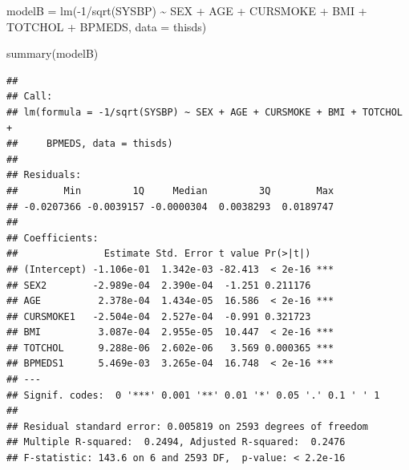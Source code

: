 \documentclass[
  10pt,
  ignorenonframetext,
]{beamer}
\newenvironment{Shaded}{\begin{snugshade}}{\end{snugshade}}
\newcommand{\AttributeTok}[1]{\textcolor[rgb]{0.77,0.63,0.00}{#1}}
\newcommand{\DecValTok}[1]{\textcolor[rgb]{0.00,0.00,0.81}{#1}}
\newcommand{\FunctionTok}[1]{\textcolor[rgb]{0.00,0.00,0.00}{#1}}
\newcommand{\NormalTok}[1]{#1}
\newcommand{\OtherTok}[1]{\textcolor[rgb]{0.56,0.35,0.01}{#1}}
\newcommand{\SpecialCharTok}[1]{\textcolor[rgb]{0.00,0.00,0.00}{#1}}
\begin{document}
\begin{frame}[fragile]
\scriptsize

\begin{Shaded}
\begin{Highlighting}[]
\NormalTok{modelB }\OtherTok{=} \FunctionTok{lm}\NormalTok{(}\SpecialCharTok{{-}}\DecValTok{1}\SpecialCharTok{/}\FunctionTok{sqrt}\NormalTok{(SYSBP) }\SpecialCharTok{\textasciitilde{}}\NormalTok{ SEX }\SpecialCharTok{+}\NormalTok{ AGE }\SpecialCharTok{+}\NormalTok{ CURSMOKE }\SpecialCharTok{+}\NormalTok{ BMI }\SpecialCharTok{+}\NormalTok{ TOTCHOL }\SpecialCharTok{+}\NormalTok{ BPMEDS, }\AttributeTok{data =}\NormalTok{ thisds)}

\FunctionTok{summary}\NormalTok{(modelB)}
\end{Highlighting}
\end{Shaded}

\begin{verbatim}
## 
## Call:
## lm(formula = -1/sqrt(SYSBP) ~ SEX + AGE + CURSMOKE + BMI + TOTCHOL + 
##     BPMEDS, data = thisds)
## 
## Residuals:
##        Min         1Q     Median         3Q        Max 
## -0.0207366 -0.0039157 -0.0000304  0.0038293  0.0189747 
## 
## Coefficients:
##               Estimate Std. Error t value Pr(>|t|)    
## (Intercept) -1.106e-01  1.342e-03 -82.413  < 2e-16 ***
## SEX2        -2.989e-04  2.390e-04  -1.251 0.211176    
## AGE          2.378e-04  1.434e-05  16.586  < 2e-16 ***
## CURSMOKE1   -2.504e-04  2.527e-04  -0.991 0.321723    
## BMI          3.087e-04  2.955e-05  10.447  < 2e-16 ***
## TOTCHOL      9.288e-06  2.602e-06   3.569 0.000365 ***
## BPMEDS1      5.469e-03  3.265e-04  16.748  < 2e-16 ***
## ---
## Signif. codes:  0 '***' 0.001 '**' 0.01 '*' 0.05 '.' 0.1 ' ' 1
## 
## Residual standard error: 0.005819 on 2593 degrees of freedom
## Multiple R-squared:  0.2494, Adjusted R-squared:  0.2476 
## F-statistic: 143.6 on 6 and 2593 DF,  p-value: < 2.2e-16
\end{verbatim}

\normalsize
\end{frame}
\end{document}
